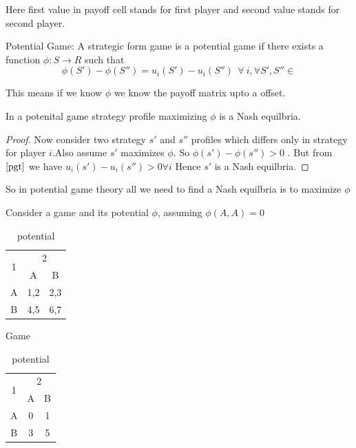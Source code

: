 \documentclass[letterpaper,english,10pt]{article}
\begin{document}
Here first value in payoff cell stands for first player and second value stands for second player.
\begin{defn}
Potential Game: A strategic form game is a potential game if there exists a function $\phi:S \to R $ such that 
\begin{equation} \label{pgt}
\phi(S')-\phi(S'') = u_i(S') - u_i(S'')~~
\forall~i , \forall S', S'' \in 
\end{equation}
\end{defn}

This means if we know $\phi$ we know the payoff matrix upto a offset. 
\begin{thm}\label{pgtne}
	In a potenital game strategy profile maximizing $\phi$ is a Nash equilbria.
\end{thm}
\begin{proof}
	Now consider two strategy $s'$ and $s''$ profiles which differs only in strategy for player $i$.Also assume $s'$ maximizes $\phi$. So $\phi(s')-\phi(s'')>0$ . But from $\ref{pgt}$ we have $u_i(s')-u_i(s'')>0 \forall i$ Hence $s'$ is a Nash equilbria.
\end{proof}
So in potential game theory all we need to find a Nash equilbria is to maximize $\phi$ 
\begin{exmp}
	Consider a game and its potential $\phi$, assuming $\phi(A,A)=0$
		\begin{table}[ht]
	\begin{minipage}{0.5\textwidth}
	\begin{center}
		\begin{tabular}{|c|c|c|}
			\hline
			\multirow{2}{*}{1} & \multicolumn{2}{c|}{2} \\ \cline{2-3} 
			& A           & B        \\ \hline
			A                  & 1,2       & 2,3     \\ \hline
			B                  & 4,5        & 6,7     \\ \hline
		\end{tabular}
	\label{game2}
	\caption{Game}
		\end{center}
	\end{minipage}
\begin{minipage}{0.5\textwidth}
	\begin{center}
		\begin{tabular}{|c|c|c|}
			\hline
			\multirow{2}{*}{1} & \multicolumn{2}{c|}{2} \\ \cline{2-3} 
			& A           & B        \\ \hline
			A                  & 0     & 1      \\ \hline
			B                  & 3        & 5    \\ \hline
		\end{tabular}
	\label{potential2}
	\caption{potential}
	\end{center}
\end{minipage}
\end{table}

\end{exmp}
\end{document}
